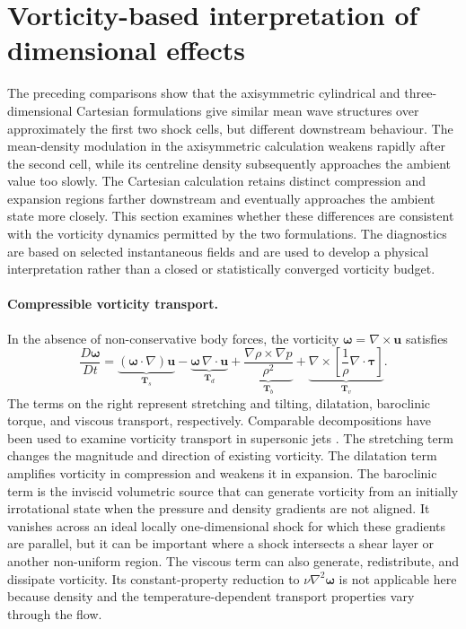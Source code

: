 \section{Vorticity-based interpretation of dimensional effects}
\label{sec:uej-vorticity-dynamics}

The preceding comparisons show that the axisymmetric cylindrical and
three-dimensional Cartesian formulations give similar mean wave structures
over approximately the first two shock cells, but different downstream
behaviour. The mean-density modulation in the axisymmetric calculation weakens
rapidly after the second cell, while its centreline density subsequently
approaches the ambient value too slowly. The Cartesian calculation retains
distinct compression and expansion regions farther downstream and eventually
approaches the ambient state more closely. This section examines whether these
differences are consistent with the vorticity dynamics permitted by the two
formulations. The diagnostics are based on selected instantaneous fields and
are used to develop a physical interpretation rather than a closed or
statistically converged vorticity budget.

\paragraph{Compressible vorticity transport.}
In the absence of non-conservative body forces, the vorticity
\(\boldsymbol{\omega}=\nabla\times\boldsymbol{u}\) satisfies
\begin{equation}
    \frac{D\boldsymbol{\omega}}{Dt}
    =
    \underbrace{(\boldsymbol{\omega}\cdot\nabla)\boldsymbol{u}}
        _{\boldsymbol{T}_s}
    -\underbrace{\boldsymbol{\omega}\,\nabla\cdot\boldsymbol{u}}
        _{\boldsymbol{T}_d}
    +\underbrace{\frac{\nabla\rho\times\nabla p}{\rho^2}}
        _{\boldsymbol{T}_b}
    +\underbrace{\nabla\times\!\left[
        \frac{1}{\rho}\nabla\cdot\boldsymbol{\tau}\right]}
        _{\boldsymbol{T}_v}.
    \label{eq:uej-vorticity-transport}
\end{equation}
The terms on the right represent stretching and tilting, dilatation,
baroclinic torque, and viscous transport, respectively. Comparable
decompositions have been used to examine vorticity transport in supersonic
jets \citep{Li2016,BhideCuppoletti2024}. The stretching term changes the
magnitude and direction of existing vorticity. The dilatation term amplifies
vorticity in compression and weakens it in expansion. The baroclinic term is
the inviscid volumetric source that can generate vorticity from an initially
irrotational state when the pressure and density gradients are not aligned.
It vanishes across an ideal locally one-dimensional shock for which these
gradients are parallel, but it can be important where a shock intersects a
shear layer or another non-uniform region. The viscous term can also generate,
redistribute, and dissipate vorticity. Its constant-property reduction to
\(\nu\nabla^2\boldsymbol{\omega}\) is not applicable here because density and
the temperature-dependent transport properties vary through the flow.

